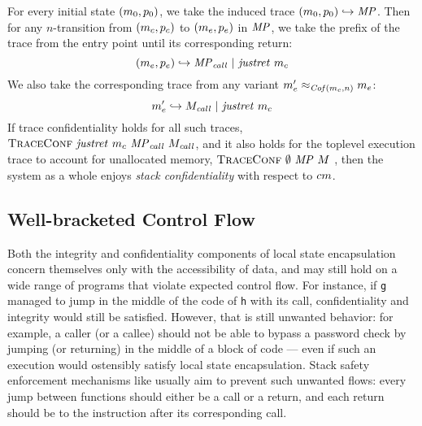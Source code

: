 \documentclass[acmsmall,review,anonymous]{acmart}\settopmatter{printfolios=true,printccs=false,printacmref=false}
\begin{document}
{%
For every initial state \((m_0,p_0)\), we take the induced trace
\((m_0,p_0) \hookrightarrow \mathit{MP}\). Then for
any \(n\)-transition from $(m_c,p_c)$ to
$(m_e,p_e)$ in $\mathit{MP}$, we take the prefix of the trace
from the entry point until its corresponding return:
%
\[(m_e,p_e) \hookrightarrow \mathit{MP}_{\mathit{call}} ~ | ~ \mathit{justret}\ m_c\]
%
We also take the corresponding trace from any variant \(m_e'
\approx_{\mathit{Cof}(m_c,n)} m_e\):
%
\[m_e' \hookrightarrow M_{\mathit{call}} ~ | ~ \mathit{justret}\ m_c\]
%
%
If trace confidentiality holds for all such traces,
\(\text{\sc TraceConf} ~ \mathit{justret}\ m_c ~ \mathit{MP}_{\mathit{call}} ~
M_{\mathit{call}}\), and it also holds for the toplevel execution
trace to account for unallocated memory, \(\text{\sc TraceConf} ~
\emptyset ~ \mathit{MP} ~ M\) , then the system as a whole enjoys {\em
  stack confidentiality} with respect to \(cm\).

\subsection{Well-bracketed Control Flow}
\label{sec:wbcf}

Both the integrity and confidentiality components of local state
encapsulation concern themselves only with the accessibility of data,
and may still hold on a wide range of programs that violate expected
control flow. For instance, if {\tt g} managed to jump in the middle of
the code of {\tt h} with its call, confidentiality and integrity would
still be satisfied.
%
However, that is still unwanted behavior: for example, a caller (or a
callee) should not be able to bypass a password check by jumping (or
returning) in the middle of a block of code --- even if such an execution
would ostensibly satisfy local state encapsulation.
%
Stack safety enforcement mechanisms like \citet{Skorstengaard+19}
usually aim to prevent such unwanted flows: every jump between
functions should either be a call or a return, and each return should
be to the instruction after its corresponding call.

}
\end{document}
